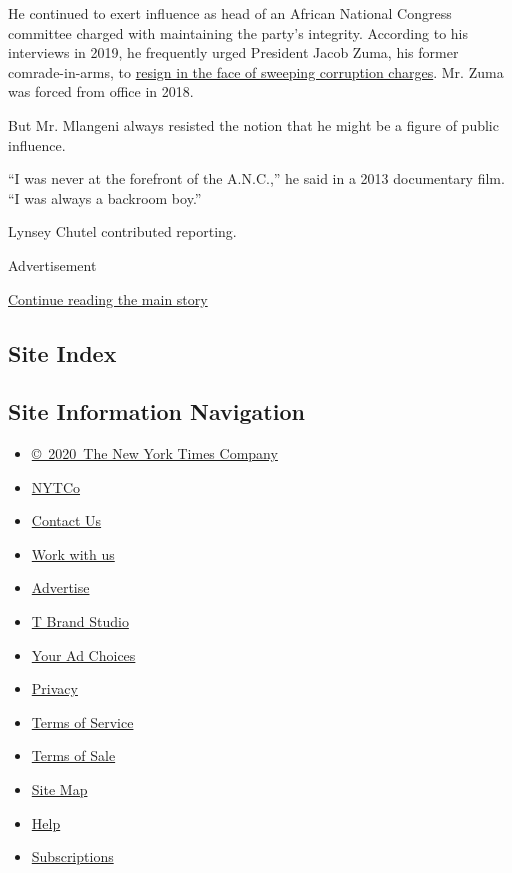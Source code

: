 He continued to exert influence as head of an African National Congress
committee charged with maintaining the party's integrity. According to
his interviews in 2019, he frequently urged President Jacob Zuma, his
former comrade-in-arms, to
\href{https://www.nytimes.com/2018/12/22/world/africa/gupta-zuma-south-africa-corruption.html}{resign
in the face of sweeping corruption charges}. Mr. Zuma was forced from
office in 2018.

But Mr. Mlangeni always resisted the notion that he might be a figure of
public influence.

``I was never at the forefront of the A.N.C.,'' he said in a 2013
documentary film. ``I was always a backroom boy.''

Lynsey Chutel contributed reporting.

Advertisement

\protect\hyperlink{after-bottom}{Continue reading the main story}

\hypertarget{site-index}{%
\subsection{Site Index}\label{site-index}}

\hypertarget{site-information-navigation}{%
\subsection{Site Information
Navigation}\label{site-information-navigation}}

\begin{itemize}
\tightlist
\item
  \href{https://help.nytimes.com/hc/en-us/articles/115014792127-Copyright-notice}{©~2020~The
  New York Times Company}
\end{itemize}

\begin{itemize}
\tightlist
\item
  \href{https://www.nytco.com/}{NYTCo}
\item
  \href{https://help.nytimes.com/hc/en-us/articles/115015385887-Contact-Us}{Contact
  Us}
\item
  \href{https://www.nytco.com/careers/}{Work with us}
\item
  \href{https://nytmediakit.com/}{Advertise}
\item
  \href{http://www.tbrandstudio.com/}{T Brand Studio}
\item
  \href{https://www.nytimes.com/privacy/cookie-policy\#how-do-i-manage-trackers}{Your
  Ad Choices}
\item
  \href{https://www.nytimes.com/privacy}{Privacy}
\item
  \href{https://help.nytimes.com/hc/en-us/articles/115014893428-Terms-of-service}{Terms
  of Service}
\item
  \href{https://help.nytimes.com/hc/en-us/articles/115014893968-Terms-of-sale}{Terms
  of Sale}
\item
  \href{https://spiderbites.nytimes.com}{Site Map}
\item
  \href{https://help.nytimes.com/hc/en-us}{Help}
\item
  \href{https://www.nytimes.com/subscription?campaignId=37WXW}{Subscriptions}
\end{itemize}

